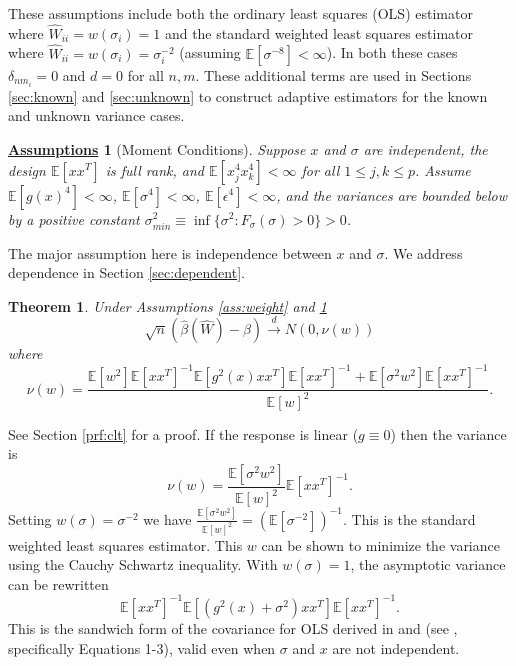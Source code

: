 \documentclass[ejs,ps,preprint]{imsart}
\numberwithin{equation}{section}
\theoremstyle{plain}
\newtheorem{thm}{Theorem}[section]
\newcommand{\E}{\mathbb{E}}
\newcommand{\rightarrowd}{\overset{d}{\to}}
\newtheorem{Assume}{\underline{\bf Assumptions}}
\def\E{\mathbb{E}}
\begin{document}
These assumptions include both the ordinary least squares (OLS) estimator where $\widehat{W}_{ii} = w(\sigma_i) = 1$ and the standard weighted least squares estimator where $\widehat{W}_{ii} = w(\sigma_i) = \sigma_i^{-2}$ (assuming $\E[\sigma^{-8}] < \infty$). In both these cases $\delta_{nm_i} = 0$ and $d = 0$ for all $n,m$. These additional terms are used in Sections \ref{sec:known} and \ref{sec:unknown} to construct adaptive estimators for the known and unknown variance cases.

\begin{Assume}[Moment Conditions]
\label{ass:moment}
Suppose $x$ and $\sigma$ are independent, the design $\E[xx^T]$ is full rank, and $\E[x_j^4x_k^4] < \infty$ for all $1 \leq j,k \leq p$. Assume $\E[g(x)^4] < \infty$, $\E[\sigma^4] < \infty$, $\E[\epsilon^4] < \infty$, and the variances are bounded below by a positive constant $\sigma_{min}^2 \equiv \inf \{\sigma^2 : F_\sigma(\sigma) > 0\} > 0$.
\end{Assume}
The major assumption here is independence between $x$ and $\sigma$. We address dependence in Section \ref{sec:dependent}.
\begin{thm}
\label{thm:clt}
Under Assumptions \ref{ass:weight} and \ref{ass:moment}
\begin{equation*}
\sqrt{n}(\widehat{\beta}(\widehat{W}) - \beta) \rightarrowd N(0,\nu(w))
\end{equation*}
where
\begin{equation}
\label{eq:asymp_var}
\nu(w) = \frac{\E[w^2]\E[xx^T]^{-1}\E[g^2(x)xx^T]\E[xx^T]^{-1} + \E[\sigma^2w^2]\E[xx^T]^{-1}}{\E[w]^2}.
\end{equation}
\end{thm}
See Section \ref{prf:clt} for a proof. If the response is linear ($g \equiv 0$) then the variance is
\begin{equation*}
\nu(w) = \frac{\E[\sigma^2w^2]}{\E[w]^{2}}\E[xx^T]^{-1}.
\end{equation*}
Setting $w(\sigma) = \sigma^{-2}$ we have $\frac{\E[\sigma^2w^2]}{\E[w]^{2}} = (\E[\sigma^{-2}])^{-1}$. This is the standard weighted least squares estimator. This $w$ can be shown to minimize the variance using the Cauchy Schwartz inequality. With $w(\sigma)=1$, the asymptotic variance can be rewritten
\begin{equation}
  \label{eq:sandwich}
\E[xx^T]^{-1}\E[(g^2(x)+\sigma^2)xx^T]\E[xx^T]^{-1}.
\end{equation}
This is the sandwich form of the covariance for OLS derived in \cite{white1980heteroskedasticity} and \cite{white1980using} (see \cite{buja2014models}, specifically Equations 1-3), valid even when $\sigma$ and $x$ are not independent.
\end{document}
